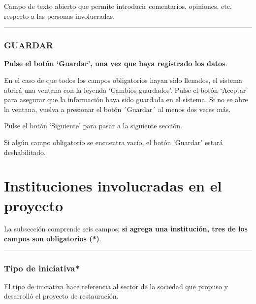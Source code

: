 \documentclass[
]{book}
\begin{document}
Campo de texto abierto que permite introducir comentarios, opiniones, etc. respecto a las personas involucradas.

\begin{center}\rule{0.5\linewidth}{0.5pt}\end{center}

\hypertarget{guardar-1}{%
\subsection*{GUARDAR}\label{guardar-1}}

\textbf{Pulse el botón `Guardar', una vez que haya registrado los datos}.

En el caso de que todos los campos obligatorios hayan sido llenados, el sistema abrirá una ventana con la leyenda `Cambios guardados'. Pulse el botón `Aceptar' para asegurar que la información haya sido guardada en el sistema. Si no se abre la ventana, vuelva a presionar el botón ´Guardar´ al menos dos veces más.

Pulse el botón `Siguiente' para pasar a la siguiente sección.

Si algún campo obligatorio se encuentra vacío, el botón `Guardar' estará deshabilitado.

\hypertarget{instituciones-involucradas-en-el-proyecto}{%
\chapter*{Instituciones involucradas en el proyecto}\label{instituciones-involucradas-en-el-proyecto}}

La subsección comprende seis campos; \textbf{si agrega una institución, tres de los campos son obligatorios ({*})}.

\begin{center}\rule{0.5\linewidth}{0.5pt}\end{center}

\hypertarget{tipo-de-iniciativa}{%
\subsection*{\texorpdfstring{{Tipo de iniciativa*}}{Tipo de iniciativa*}}\label{tipo-de-iniciativa}}

El tipo de iniciativa hace referencia al sector de la sociedad que propuso y desarrolló el proyecto de restauración.
\end{document}
